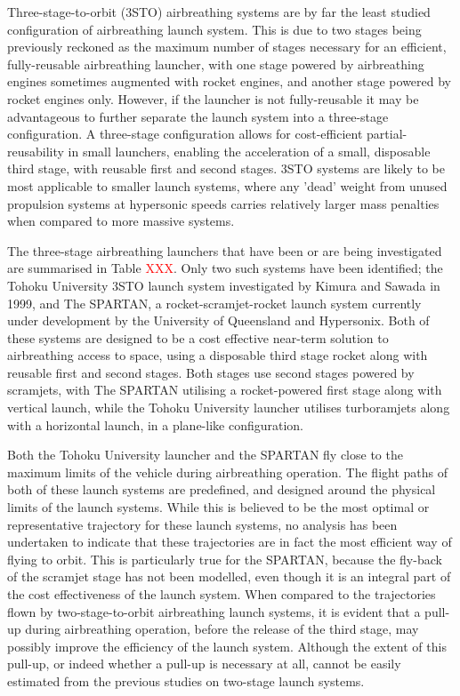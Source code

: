 Three-stage-to-orbit (3STO) airbreathing systems are by far the least studied configuration of airbreathing launch system. This is due to two stages being previously reckoned as the maximum number of stages necessary for an efficient, fully-reusable airbreathing launcher, with one stage powered by airbreathing engines sometimes augmented with rocket engines, and another stage powered by rocket engines only. However, if the launcher is not fully-reusable it may be advantageous to further separate the launch system into a three-stage configuration. A three-stage configuration allows for cost-efficient partial-reusability in small launchers, enabling the acceleration of a small, disposable third stage, with reusable first and second stages. 
3STO systems are likely to be most applicable to smaller launch systems, where any 'dead' weight from unused propulsion systems at hypersonic speeds carries relatively larger mass penalties when compared to more massive systems. 

The three-stage airbreathing launchers that have been or are being investigated are summarised in Table \textcolor{red}{XXX}. Only two such systems have been identified; the Tohoku University 3STO launch system investigated by Kimura and Sawada in 1999\cite{Kimura1999}, and The SPARTAN, a rocket-scramjet-rocket launch system currently under development by the University of Queensland and Hypersonix. Both of these systems are designed to be a cost effective near-term solution to airbreathing access to space, using a disposable third stage rocket along with reusable first and second stages. Both stages use second stages powered by scramjets, with The SPARTAN utilising a rocket-powered first stage along with vertical launch, while the Tohoku University launcher utilises turboramjets along with a horizontal launch, in a plane-like configuration. 


Both the Tohoku University launcher and the SPARTAN fly close to the maximum limits of the vehicle during airbreathing operation. The flight paths of both of these launch systems are predefined, and designed around the physical limits of the launch systems.  
While this is believed to be the most optimal or representative trajectory for these launch systems, no analysis has been undertaken to indicate that these trajectories are in fact the most efficient way of flying to orbit. This is particularly true for the SPARTAN, because the fly-back of the scramjet stage has not been modelled, even though it is an integral part of the cost effectiveness of the launch system. 
When compared to the trajectories flown by two-stage-to-orbit airbreathing launch systems, it is evident that a pull-up during airbreathing operation, before the release of the third stage, may possibly improve the efficiency of the launch system. Although the extent of this pull-up, or indeed whether a pull-up is necessary at all, cannot be easily estimated from the previous studies on two-stage launch systems.

